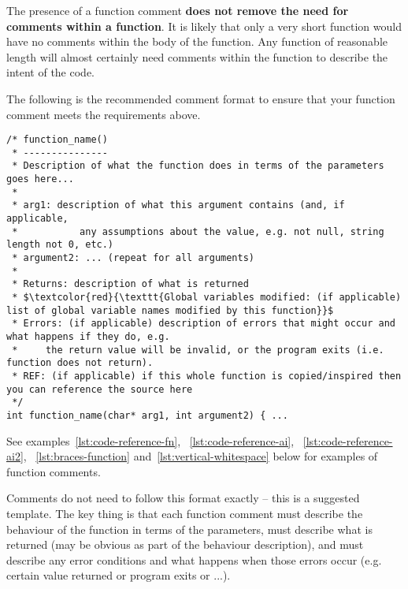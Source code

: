 \documentclass{article}
\begin{document}
The presence of a function comment \textbf{does not remove the need for comments within a function}. It is likely that only a very short
function would have no comments within the body of the function. Any function of reasonable length will almost certainly need
comments within the function to describe the intent of the code.

The following is the recommended comment format to ensure that your function comment meets the requirements above.

\nolinenumbers
\begin{lstlisting}[mathescape=true]
/* function_name()
 * ---------------
 * Description of what the function does in terms of the parameters goes here...
 *
 * arg1: description of what this argument contains (and, if applicable, 
 *           any assumptions about the value, e.g. not null, string length not 0, etc.)
 * argument2: ... (repeat for all arguments)
 *
 * Returns: description of what is returned
 * $\textcolor{red}{\texttt{Global variables modified: (if applicable) list of global variable names modified by this function}}$
 * Errors: (if applicable) description of errors that might occur and what happens if they do, e.g.
 *     the return value will be invalid, or the program exits (i.e. function does not return). 
 * REF: (if applicable) if this whole function is copied/inspired then you can reference the source here
 */
int function_name(char* arg1, int argument2) { ...
\end{lstlisting}
\linenumbers

See examples~\ref{lst:code-reference-fn}, ~\ref{lst:code-reference-ai}, ~\ref{lst:code-reference-ai2}, ~\ref{lst:braces-function} and~\ref{lst:vertical-whitespace} below for examples of function 
comments.

Comments do not need to follow this format exactly -- this is a suggested template. The key thing is that each function comment 
must describe the behaviour of the function in terms of the parameters, must describe what is returned (may be obvious as 
part of the behaviour description), and must describe any error conditions and what happens when those errors occur (e.g.
certain value returned or program exits or ...).
\end{document}
